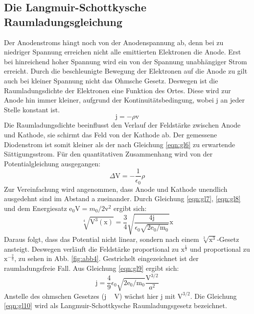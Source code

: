 \subsection{Die Langmuir-Schottkysche Raumladungsgleichung}
Der Anodenstroms hängt noch von der Anodenspannung ab, denn bei zu niedriger Spannung erreichen nicht alle emittierten Elektronen die Anode.
Erst bei hinreichend hoher Spannung wird ein von der Spannung unabhängiger Strom erreicht.
Durch die beschleunigte Bewegung der Elektronen auf die Anode zu gilt auch bei kleiner Spannung nicht das Ohmsche Gesetz.
Deswegen ist die Raumladungsdichte \rho der Elektronen eine Funktion des Ortes.
Diese wird zur Anode hin immer kleiner, aufgrund der Kontinuitätsbedingung, wobei j an jeder Stelle konstant ist.
\begin{equation}
    \text{j} = - \rho \text{v}
    \label{eqn:gl7}
\end{equation}
Die Raumladungsdichte \rho beeinflusst den Verlauf der Feldstärke zwischen Anode und Kathode, sie schirmt das Feld von der Kathode ab.
Der gemessene Diodenstrom ist somit kleiner als der nach Gleichung \ref{eqn:gl6} zu erwartende Sättigungsstrom.
Für den quantitativen Zusammenhang wird von der Potentialgleichung ausgegangen:
\begin{equation}
    \Delta \text{V} = - \frac{1}{\epsilon_0} \rho
    \label{eqn:gl8} 
\end{equation}
Zur Vereinfachung wird angenommen, dass Anode und Kathode unendlich ausgedehnt sind im Abstand a zueinander.
Durch Gleichung \ref{eqn:gl7}, \ref{eqn:gl8} und dem Energiesatz $\text{e}_0 \text{V} = m_0/2 \text{v}^2$ ergibt sich:
\begin{equation}
    \sqrt[4]{\text{V}^3(\text{x})} = \frac{3}{4} \sqrt{\frac{4 \text{j}}{\epsilon_0 \sqrt{2 \text{e}_0/\text{m}_0}}}\text{x}
    \label{eqn:gl9}
\end{equation}
Daraus folgt, dass das Potential nicht linear, sondern nach einem $\sqrt[3]{\text{x}^3}$-Gesetz ansteigt.
Deswegen verläuft die Feldstärke proportional zu $\text{x}^{\frac{1}{3}}$ und \rho proportional zu $\text{x}^{-\frac{2}{3}}$, zu sehen in Abb. \ref{fig:abb4}.
Gestrichelt eingezeichnet ist der raumladungsfreie Fall.
Aus Gleichung \ref{eqn:gl9} ergibt sich:
\begin{equation}
    \text{j} = \frac{4}{9} \epsilon_0 \sqrt{2 \text{e}_0/\text{m}_0} \frac{\text{V}^{3/2}}{a^2}
    \label{eqn:gl10}
\end{equation}
Anstelle des ohmschen Gesetzes (j ~ V) wächst hier j mit $\text{V}^{3/2}$.
Die Gleichung \ref{eqn:gl10} wird als Langmuir-Schottkysche Raumladungsgesetz bezeichnet.
